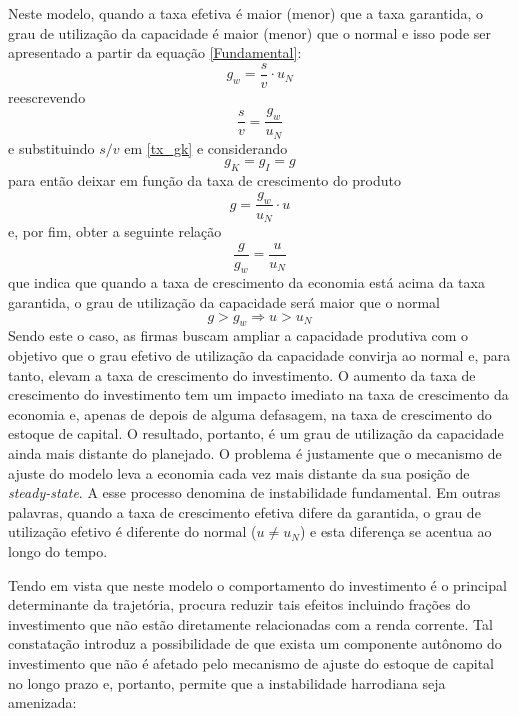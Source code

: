 Neste modelo, quando a taxa efetiva é maior (menor) que a taxa garantida, o grau de utilização da capacidade é maior (menor) que o normal e isso pode ser apresentado a partir da equação \ref{Fundamental}:
$$
g_w = \frac{s}{v}\cdot u_N
$$
reescrevendo
$$
\frac{s}{v} = \frac{g_w}{u_N}
$$
e substituindo  $s/v$ em \ref{tx_gk} e considerando
$$
g_K = g_I = g
$$ 
para então deixar em função da taxa de crescimento do produto
$$
g = \frac{g_w}{u_N}\cdot u
$$
e, por fim, obter a seguinte relação
$$
\frac{g}{g_w} = \frac{u}{u_N}
$$
que indica que quando a taxa de crescimento da economia está acima da taxa garantida, o grau de utilização da capacidade será maior que o normal
$$
g > g_w \Rightarrow u > u_N
$$
Sendo este o caso, as firmas buscam ampliar a capacidade produtiva com o objetivo que o grau efetivo de utilização da capacidade convirja ao normal e, para tanto, elevam a taxa de crescimento do investimento. O aumento da taxa de crescimento do investimento tem um impacto imediato na taxa de crescimento da
economia e, apenas de depois de alguma defasagem, na taxa de crescimento do estoque de capital. O resultado, portanto, é um grau de utilização da capacidade ainda mais distante do planejado. O problema é justamente que o mecanismo de ajuste do modelo leva a economia cada vez mais distante da sua posição de \textit{steady-state}. A esse processo \textcite{harrod_essay_1939} denomina de instabilidade fundamental. Em outras palavras, quando a taxa de crescimento efetiva difere  da garantida, o grau de utilização efetivo é diferente do normal ($u\neq u_N$) e esta diferença se acentua ao longo do tempo.






Tendo em vista que neste modelo o comportamento do investimento é o principal determinante da trajetória, \textcite[p.~26--28]{harrod_essay_1939} procura reduzir tais efeitos incluindo frações do investimento que não estão diretamente relacionadas com a renda corrente. Tal constatação introduz a possibilidade de que exista um componente autônomo do investimento que não é afetado pelo mecanismo de ajuste do estoque de capital no longo prazo e, portanto, permite que a instabilidade harrodiana seja amenizada:

